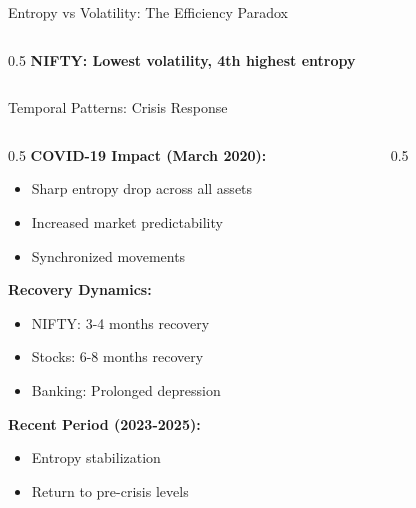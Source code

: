 \documentclass[aspectratio=169,12pt,xcolor=table]{beamer}
\begin{document}
\begin{frame}{Entropy vs Volatility: The Efficiency Paradox}
\begin{columns}[T]
\begin{column}{0.5\textwidth}
    \vspace{0.2cm}
    \textcolor{niftyblue}{\textbf{NIFTY: Lowest volatility, 4th highest entropy}}
\end{column}
\end{columns}
\end{frame}

\begin{frame}{Temporal Patterns: Crisis Response}
\begin{columns}[T]
\begin{column}{0.5\textwidth}
    \textbf{COVID-19 Impact (March 2020):}
    \begin{itemize}
        \item Sharp entropy drop across all assets
        \item Increased market predictability
        \item Synchronized movements
    \end{itemize}
    
    \vspace{0.1cm}
    \textbf{Recovery Dynamics:}
    \begin{itemize}
        \item NIFTY: 3-4 months recovery
        \item Stocks: 6-8 months recovery
        \item Banking: Prolonged depression
    \end{itemize}
    
    \vspace{0.1cm}
    \textbf{Recent Period (2023-2025):}
    \begin{itemize}
        \item Entropy stabilization
        \item Return to pre-crisis levels
    \end{itemize}
\end{column}

\begin{column}{0.5\textwidth}
    \begin{center}
\end{center}
\end{column}
\end{columns}
\end{frame}
\end{document}
